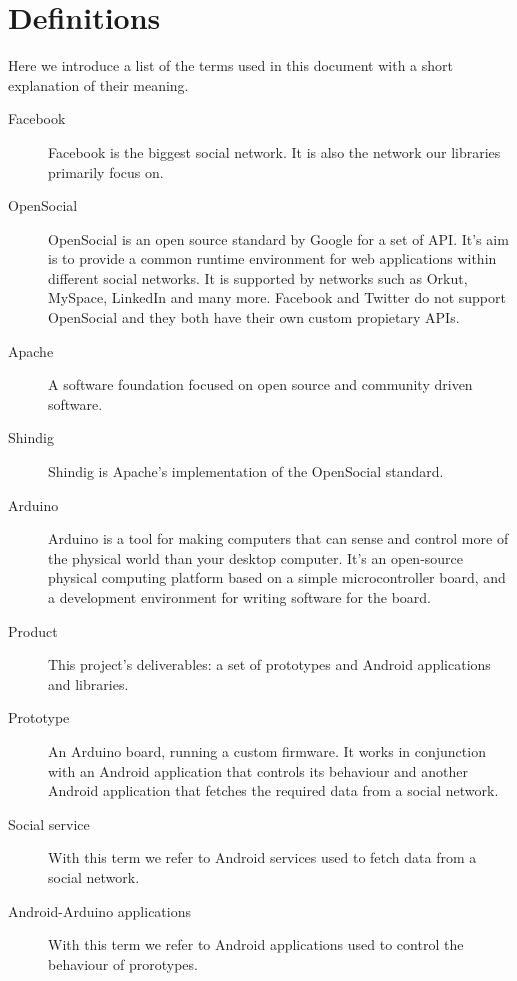 \section{Definitions}

Here we introduce a list of the terms used in this document with a short explanation of their meaning.

\begin{description}
\item[Facebook] Facebook is the biggest social network. It is also the network our libraries primarily focus on.
\item[OpenSocial] OpenSocial\cite{link:opensocial} is an open source standard by Google for a set of API. It's aim is to
provide a common runtime environment for web applications within different social networks. It is supported by networks
such as Orkut, MySpace, LinkedIn and many more. Facebook and Twitter do not support OpenSocial and they both have their
own custom propietary APIs.
\item[Apache] A software foundation focused on open source and community driven software.
\item[Shindig] Shindig is Apache's implementation of the OpenSocial standard.
\item[Arduino] Arduino is a tool for making computers that can sense and control more of the physical world than your
desktop computer. It's an open-source physical computing platform based on a simple microcontroller board, and a development
environment for writing software for the board. \cite{link:arduino}
\item[Product] This project's deliverables: a set of prototypes and Android applications and libraries.
\item[Prototype] An Arduino board, running a custom firmware. It works in conjunction with an Android application
that controls its behaviour and another Android application that fetches the required data from a social network.
\item[Social service] With this term we refer to Android services used to fetch data from a social network.
\item[Android-Arduino applications] With this term we refer to Android applications used to control the behaviour of prorotypes.
\end{description}